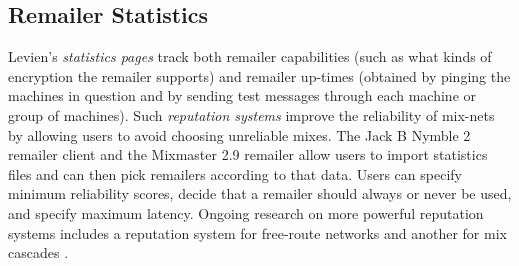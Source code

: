 \documentclass[11pt]{IEEEtran}
\begin{document}
%
%

\subsection{Remailer Statistics}

Levien's \emph{statistics pages} \cite{levien} track both remailer
capabilities (such as what kinds of encryption the remailer supports)
and remailer up-times (obtained by pinging the machines in question
and by sending test messages through each machine or group of
machines).  Such \emph{reputation systems} improve the reliability of
mix-nets by allowing users to avoid choosing unreliable mixes. The
Jack B Nymble 2 remailer client \cite{potato} and the Mixmaster 2.9
remailer allow users to import statistics files and can then pick
remailers according to that data. Users can specify minimum
reliability scores, decide that a remailer should always or never be
used, and specify maximum latency. Ongoing research on more powerful
reputation systems includes a reputation system for free-route
networks \cite{mix-acc} and another for mix cascades \cite{casc-rep}.

\end{document}

